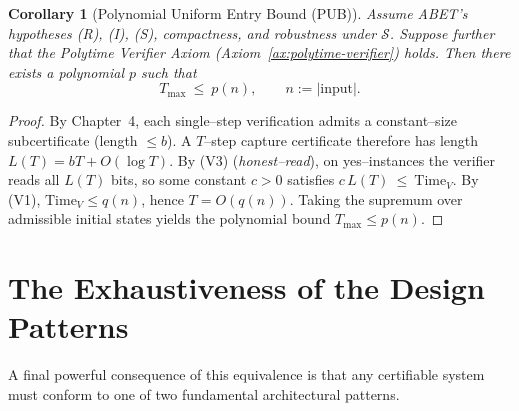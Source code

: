 \documentclass[12pt]{article}
\theoremstyle{definition}
\theoremstyle{plain}
\newtheorem{corollary}{Corollary}[section]
\begin{document}
\begin{corollary}[Polynomial Uniform Entry Bound (PUB)]
\label{cor:poly-uniform-entry-bound}
Assume ABET’s hypotheses (R), (I), (S), compactness, and robustness under $\mathcal S$. Suppose further that the Polytime Verifier Axiom (Axiom~\ref{ax:polytime-verifier}) holds. Then there exists a polynomial $p$ such that
\[
  T_{\max}\ \le\ p(n),
  \qquad n:=|\text{input}|.
\]
\end{corollary}

\begin{proof}
By Chapter~4, each single–step verification admits a constant–size subcertificate (length $\le b$). A $T$–step capture certificate therefore has length
\(
  L(T)=bT+O(\log T).
\)
By (V3) (\emph{honest–read}), on yes–instances the verifier reads all $L(T)$ bits, so some constant $c>0$ satisfies
\(
  c\,L(T)\ \le\ \mathrm{Time}_V.
\)
By (V1), $\mathrm{Time}_V\le q(n)$, hence $T=O(q(n))$. Taking the supremum over admissible initial states yields the polynomial bound $T_{\max}\le p(n)$.
\end{proof}



\section{The Exhaustiveness of the Design Patterns}

A final powerful consequence of this equivalence is that any certifiable system must conform to one of two fundamental architectural patterns.
\end{document}
